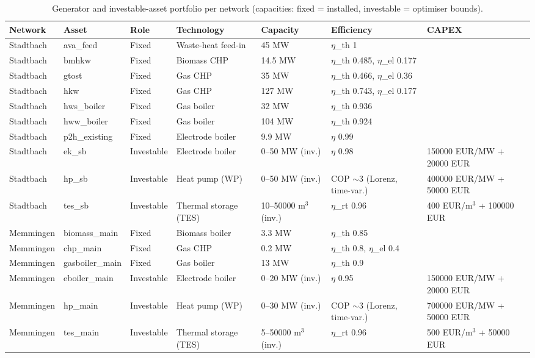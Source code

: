 \begin{table}[htbp]
  \centering
  \caption{Generator and investable-asset portfolio per network (capacities: fixed = installed, investable = optimiser bounds).}
  \label{tab:t1_generators}
  \begin{tabular}{lllllll}
  \toprule
  Network & Asset & Role & Technology & Capacity & Efficiency & CAPEX \\
  \midrule
  Stadtbach & ava\_feed & Fixed & Waste-heat feed-in & 45 MW & $\eta$\_th 1 &  \\
  Stadtbach & bmhkw & Fixed & Biomass CHP & 14.5 MW & $\eta$\_th 0.485, $\eta$\_el 0.177 &  \\
  Stadtbach & gtost & Fixed & Gas CHP & 35 MW & $\eta$\_th 0.466, $\eta$\_el 0.36 &  \\
  Stadtbach & hkw & Fixed & Gas CHP & 127 MW & $\eta$\_th 0.743, $\eta$\_el 0.177 &  \\
  Stadtbach & hws\_boiler & Fixed & Gas boiler & 32 MW & $\eta$\_th 0.936 &  \\
  Stadtbach & hww\_boiler & Fixed & Gas boiler & 104 MW & $\eta$\_th 0.924 &  \\
  Stadtbach & p2h\_existing & Fixed & Electrode boiler & 9.9 MW & $\eta$ 0.99 &  \\
  Stadtbach & ek\_sb & Investable & Electrode boiler & 0--50 MW (inv.) & $\eta$ 0.98 & 150000 EUR/MW + 20000 EUR \\
  Stadtbach & hp\_sb & Investable & Heat pump (WP) & 0--50 MW (inv.) & COP $\sim$3 (Lorenz, time-var.) & 400000 EUR/MW + 50000 EUR \\
  Stadtbach & tes\_sb & Investable & Thermal storage (TES) & 10--50000 m$^3$ (inv.) & $\eta$\_rt 0.96 & 400 EUR/m$^3$ + 100000 EUR \\
  Memmingen & biomass\_main & Fixed & Biomass boiler & 3.3 MW & $\eta$\_th 0.85 &  \\
  Memmingen & chp\_main & Fixed & Gas CHP & 0.2 MW & $\eta$\_th 0.8, $\eta$\_el 0.4 &  \\
  Memmingen & gasboiler\_main & Fixed & Gas boiler & 13 MW & $\eta$\_th 0.9 &  \\
  Memmingen & eboiler\_main & Investable & Electrode boiler & 0--20 MW (inv.) & $\eta$ 0.95 & 150000 EUR/MW + 20000 EUR \\
  Memmingen & hp\_main & Investable & Heat pump (WP) & 0--30 MW (inv.) & COP $\sim$3 (Lorenz, time-var.) & 700000 EUR/MW + 50000 EUR \\
  Memmingen & tes\_main & Investable & Thermal storage (TES) & 5--50000 m$^3$ (inv.) & $\eta$\_rt 0.96 & 500 EUR/m$^3$ + 50000 EUR \\
  \bottomrule
  \end{tabular}
\end{table}
